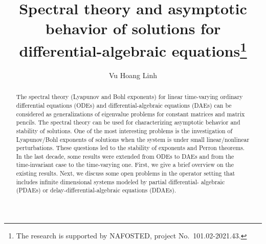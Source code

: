 \documentclass[12pt]{llncs}
\begin{document}
\fi

\title{Spectral theory and asymptotic behavior of solutions for differential-algebraic equations\thanks{The research is supported by NAFOSTED, project No.~101.02-2021.43.}}

\author{Vu Hoang Linh
  }

\maketitle

\begin{abstract}
The spectral theory (Lyapunov and Bohl exponents) for linear time-varying
ordinary differential equations (ODEs) and differential-algebraic equations (DAEs)
can be considered as generalizations of eigenvalue problems for
constant matrices and matrix pencils. The spectral theory can be used for characterizing
asymptotic behavior and stability of solutions. One of the most interesting problems 
is the investigation of Lyapunov/Bohl exponents of solutions when the system is
under small linear/nonlinear perturbations. These questions led to the stability of 
exponents and Perron theorems. In the last decade, some results were
extended from ODEs to DAEs and from the time-invariant case to the time-varying
one. First, we give a brief overview on the existing results. Next, we discuss some open problems 
in the operator setting that includes infinite dimensional systems modeled by partial differential-
algebraic (PDAEs) or delay-differential-algebraic equations (DDAEs).
\end{abstract}


\end{document}
